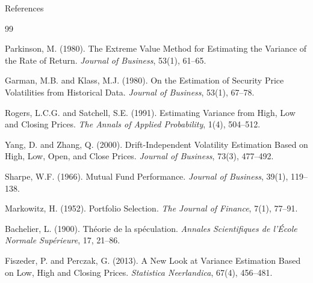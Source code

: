 \documentclass[9pt, aspectratio=169, t]{beamer}
\theoremstyle{definition}
\begin{document}
\begin{frame}{References}

\scriptsize
\begin{thebibliography}{99}

 Parkinson, M. (1980). The Extreme Value Method for Estimating the Variance of the Rate of Return. \textit{Journal of Business}, 53(1), 61--65.

 Garman, M.B. and Klass, M.J. (1980). On the Estimation of Security Price Volatilities from Historical Data. \textit{Journal of Business}, 53(1), 67--78.

 Rogers, L.C.G. and Satchell, S.E. (1991). Estimating Variance from High, Low and Closing Prices. \textit{The Annals of Applied Probability}, 1(4), 504--512.

 Yang, D. and Zhang, Q. (2000). Drift-Independent Volatility Estimation Based on High, Low, Open, and Close Prices. \textit{Journal of Business}, 73(3), 477--492.

 Sharpe, W.F. (1966). Mutual Fund Performance. \textit{Journal of Business}, 39(1), 119--138.

 Markowitz, H. (1952). Portfolio Selection. \textit{The Journal of Finance}, 7(1), 77--91.

 Bachelier, L. (1900). Th\'{e}orie de la sp\'{e}culation. \textit{Annales Scientifiques de l'\'{E}cole Normale Sup\'{e}rieure}, 17, 21--86.

 Fiszeder, P. and Perczak, G. (2013). A New Look at Variance Estimation Based on Low, High and Closing Prices. \textit{Statistica Neerlandica}, 67(4), 456--481.

\end{thebibliography}

\end{frame}
\end{document}
